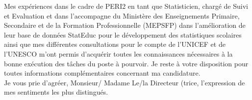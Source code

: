 \documentclass[11pt, a4paper]{awesome-cv}
\begin{document}
\begin{cvletter}
Mes expériences dans le cadre de PERI2 en tant que Statisticien, chargé de Suivi et Evaluation et  dans l’accompagne du Ministère des Enseignements Primaire, Secondaire et de la Formation Professionnelle (MEPSFP) dans l'amélioration de leur base de données StatEduc pour le développement des statistiques scolaires ainsi que mes différentes consultations pour le compte de l’UNICEF et de l’UNESCO m’ont permis d’acquérir toutes les connaissances nécessaires à la bonne exécution des tâches du poste à pourvoir.
Je reste à votre disposition pour toutes informations complémentaires concernant ma candidature.\\
Je vous prie d’agréer, Monsieur/ Madame Le/la  Directeur (trice, l’expression de mes sentiments les plus distingués.
\\


\end{cvletter}


\makeletterclosing
\end{document}
